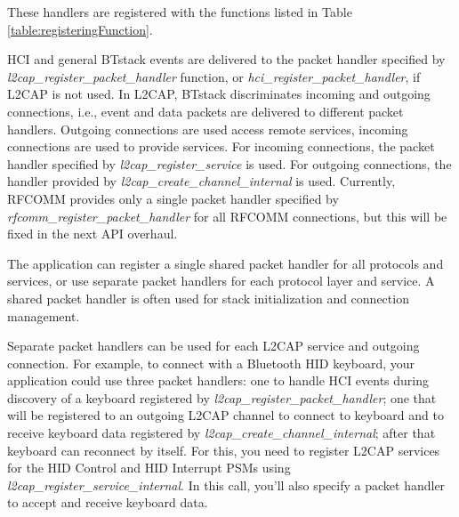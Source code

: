 \documentclass[a4paper,titlepage,oneside,12pt]{amsart} %
\newcommand{\urlfoot}[2]{\href{#1}{{\color{blue} #2}}\footnote{#1}}
\begin{document}
These handlers are registered with the functions listed in Table \ref{table:registeringFunction}. 

HCI and general BTstack events are delivered to the packet handler specified by \emph{l2cap\_register\_packet\_handler} function, or \emph{hci\_register\_packet\_handler}, if L2CAP is not used. In L2CAP, BTstack discriminates incoming and outgoing connections, i.e., event and data packets are delivered to different packet handlers. Outgoing connections are used access remote services, incoming connections are used to provide services. For incoming connections, the packet handler specified by \emph{l2cap\_register\_service} is used. For outgoing connections, the handler provided by \emph{l2cap\_create\_channel\_internal} is used.
Currently, RFCOMM provides only a single packet handler specified by \emph{rfcomm\_register\_packet\_handler} for all RFCOMM connections, but this will be fixed in the next API overhaul.
 
The application can register a single shared packet handler for all protocols and services, or use separate packet handlers for each protocol layer and service. A shared packet handler is often used for stack initialization and connection management.

Separate packet handlers can be used for each L2CAP service and outgoing connection. For example, to connect with a Bluetooth HID keyboard, your application could use three packet handlers: one to handle HCI events during discovery of a keyboard registered by \emph{l2cap\_register\_packet\_handler}; one that will be registered to an outgoing L2CAP channel to connect to keyboard and to receive keyboard data registered by \emph{l2cap\_create\_channel\_internal}; after that keyboard can reconnect by itself. For this, you need to register L2CAP services for the HID Control and HID Interrupt PSMs using \emph{l2cap\_register\_service\_internal}. In this call, you'll also specify a packet handler to accept and receive keyboard data. 

\newcommand{\BluetoothSpecification}{\urlfoot{https://www.bluetooth.org/Technical/Specifications/adopted.htm}{Bluetooth Specification}}
\newcommand{\BluetoothSpecificationURL}{\href{https://www.bluetooth.org/Technical/Specifications/adopted.htm}{\color{blue} Bluetooth Specification}}


%

\end{document}
